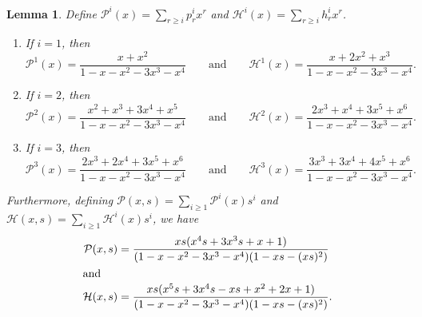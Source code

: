 \documentclass{amsart}
\newtheorem{lemma}[theorem]{Lemma}
\theoremstyle{definition}
\newcommand{\calP}{\mathcal{P}}
\newcommand{\calH}{\mathcal{H}}
\begin{document}
\begin{lemma}\label{lem:GenFxnPiAndHi}
Define $\calP^i(x) = \displaystyle\sum_{r \geq i} p_r^i x^r$ and $\calH^i(x) = \displaystyle\sum_{r \geq i} h_r^i x^r$.

\begin{enumerate}
    \item If $i = 1$, then \[
\calP^1(x) = \frac{x + x^2}{1 - x - x^2 - 3x^3 - x^4} \qquad
\mbox{and} \qquad 
\calH^1(x) = \frac{x + 2x^2 + x^3}{1 - x - x^2 - 3x^3 - x^4}
.\]
\item If $i = 2$, then 
\[
\calP^2(x) = \frac{x^2 + x^{3} + 3x^{4} + x^{5}}{1 - x - x^2 - 3x^3 - x^4} 
\qquad 
\mbox{and}
\qquad 
\calH^2(x) = \frac{2x^3 + x^{4} + 3x^{5} + x^{6}}{1 - x - x^2 - 3x^3 - x^4}
.\]
\item If $i=3$, then \[
\calP^3(x) = \frac{2x^3 + 2x^{4} + 3x^{5} + x^{6}}{1-x-x^2 - 3x^3 - x^4} 
\qquad 
\mbox{and}
\qquad \calH^3(x) = \frac{3x^3 + 3x^{4} + 4 x^{5} + x^{6}}{1-x-x^2 - 3x^3 - x^4}
.\]
\end{enumerate}

Furthermore, defining $\calP(x,s)=\sum_{i\geq1} \calP^i(x)s^i$ and $\calH(x,s)=\sum_{i\geq1}\calH^i(x)s^i$, we have \begin{align*}
\calP(x,s)&=\frac{xs(x^4s+3x^3s+x+1)}{(1-x-x^2-3x^3-x^4)(1-xs-(xs)^2)}\\
\intertext{and}
\calH(x,s)&=\frac{xs(x^5s+3x^4s-xs+x^2+2x+1)}{(1-x-x^2-3x^3-x^4)(1-xs-(xs)^2)}.\\
\end{align*}
\end{lemma}
\end{document}
